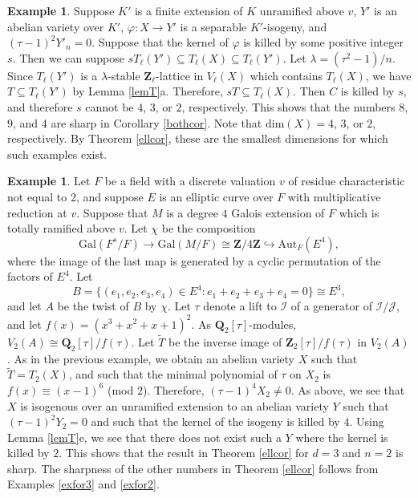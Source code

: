 \documentclass{amsart}
\def\Q{{\mathbf Q}}
\def\Z{{\mathbf Z}}
\def\Gal{\mathrm{Gal}}
\def\Aut{\mathrm{Aut}}
\def\I{{\mathcal I}}
\def\J{{\mathcal J}}
\def\dim{\mathrm{dim}}
\theoremstyle{definition}
\newtheorem{ex}[thm]{Example}
\begin{document}
\begin{ex}
Suppose $K'$ is a finite
extension of $K$ unramified above $v$,
$Y'$ is an abelian variety over $K'$, $\varphi : X \to Y'$
is a separable $K'$-isogeny,
and $(\tau - 1)^{2}Y'_{n} = 0$. Suppose that the kernel of
$\varphi$ is killed by some positive integer $s$. Then we can
suppose 
$sT_{\ell}(Y') \subseteq T_{\ell}(X) \subseteq T_{\ell}(Y')$.
 Let $\lambda = (\tau^{2} - 1)/n$.
Since $T_{\ell}(Y')$ is a $\lambda$-stable $\Z_{\ell}$-lattice
in $V_{\ell}(X)$ which contains $T_{\ell}(X)$, we have 
$T \subseteq T_{\ell}(Y')$ by Lemma \ref{lemT}a. 
Therefore, $sT \subseteq T_{\ell}(X)$. 
Then $C$ is killed by $s$, and therefore $s$
cannot be $4$, $3$, or $2$, respectively. This shows
that the numbers $8$, $9$, and $4$ are sharp in Corollary \ref{bothcor}.
Note that $\dim(X) = 4$, $3$, or $2$, respectively. By 
Theorem \ref{ellcor}, these are the smallest dimensions for which
such examples exist.
\end{ex}

\begin{ex}
Let $F$ be a field with a discrete valuation $v$ of residue 
characteristic not equal to $2$, and suppose $E$ is an
elliptic curve over $F$ with multiplicative reduction at $v$.
Suppose that $M$ is a degree $4$ Galois extension of $F$ which is
totally ramified above $v$. Let $\chi$ be the composition
$$\Gal(F^{s}/F) \to \Gal(M/F) \cong \Z/4\Z \hookrightarrow
\Aut_{F}(E^{4}),$$
where the image of the last map is generated by a cyclic permutation
of the factors of $E^{4}$. 
Let 
$$B =
\{(e_{1},e_{2},e_{3},e_{4}) \in E^{4} : 
e_{1} + e_{2} + e_{3} + e_{4} = 0\} \cong E^{3},$$
and let $A$ be the twist of $B$ by $\chi$.
Let $\tau$ denote a lift to $\I$ of a generator of $\I/\J$,
and let $f(x) = (x^{3}+x^{2}+x+1)^{2}$.
As $\Q_{2}[\tau]$-modules, 
$V_{2}(A) \cong \Q_{2}[\tau]/f(\tau)$.
Let ${\tilde T}$ be the 
inverse image of $\Z_{2}[\tau]/f(\tau)$ in $V_{2}(A)$.
As in the previous example, we obtain an abelian variety $X$
such that ${\tilde T} = T_{2}(X)$, and 
such that the minimal polynomial of
$\tau$ on $X_{2}$ is $f(x) \equiv (x-1)^{6}$ (mod $2$). 
Therefore, 
$(\tau - 1)^{4}X_{2} \ne 0$.
As above, we see that $X$ is isogenous 
over an unramified extension to an abelian variety $Y$  
such that $(\tau-1)^{2}Y_{2} = 0$ and such that 
the kernel of the isogeny is killed by $4$.
Using Lemma \ref{lemT}e, we see that there does not
exist such a $Y$ where the kernel is killed by $2$.
This shows that the result in Theorem \ref{ellcor} for
$d=3$ and $n=2$ is sharp. The sharpness of the other numbers 
in Theorem \ref{ellcor} follows from Examples \ref{exfor3} 
and \ref{exfor2}.
\end{ex}
\end{document}
